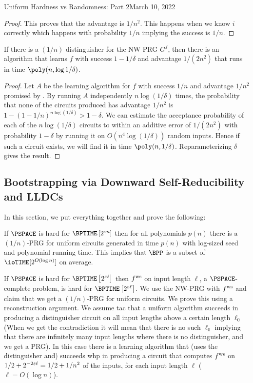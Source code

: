 \begin{lecture}{8}{Uniform Hardness vs Randomness: Part 2}{March 10, 2022}
\begin{proof}
This proves that the advantage is $1/n^2$. This happens when we know $i$ correctly which happens with probability $1/n$ implying the success is $1/n$.	
\end{proof}


\begin{corollary}\label{cor:learning-boost-success}
	If there is a $(1/n)$-distinguisher for the NW-PRG $G^f$, then there is an
	algorithm that learns $f$ with success $1 - 1/\delta$ and advantage
	$1/(2n^2)$ that runs in time $\poly(n, \log{1/\delta})$.
\end{corollary}

\begin{proof}
	Let $A$ be the learning algorithm for $f$ with success $1/n$ and advantage
	$1/n^2$ promised by . By running $A$
	independently $n \log(1/\delta)$ times, the probability that none of the
	circuits produced has advantage $1/n^2$ is $1 - (1 - 1/n)^{n\log(1/\delta)} >
	1 - \delta$. We can estimate the acceptance probability of each of the
	$n\log(1/\delta)$ circuits to within an additive error of $1/(2n^2)$ with
	probability $1 - \delta$ by running it on $O(n^4 \log(1/\delta))$ random
	inputs. Hence if such a circuit exists, we will find it in time $\poly(n,
	1/\delta)$. Reparameterizing $\delta$ gives the result.
\end{proof}


\subsection{Bootstrapping via Downward Self-Reducibility and LLDCs}
In this section, we put everything together and prove the following:
\begin{theorem}
	If $\PSPACE$ is hard for $\BPTIME\left[2^{\eps n}\right]$ then for all polynomials $p(n)$ there is a $(1/n)$-PRG for uniform circuits generated in time $p(n)$ with log-sized seed and polynomial running time. This implies that $\BPP$ is a subset of $\ioTIME[2^{O(\log n)}]$ on average.
\end{theorem}


If $\PSPACE$ is hard for $\BPTIME\left[2^{\eps \ell}\right]$ then $ f^{\text{ws}} $ on input length $\ell$, a $\PSPACE$-complete problem, is hard for $\BPTIME\left[2^{\eps \ell}\right]$. 
We use the NW-PRG with $ f^{\text{ws}} $ and claim that we get a $(1/n)$-PRG for uniform circuits. We prove this using a reconstruction argument. 
We assume tac that a uniform algorithm succeeds in producing a distinguisher circuit on all input lengths above a certain length $\ell_0$ (When we get the contradiction it will mean that there is no such $\ell_0$ implying that there are infinitely many input lengths where there is no distinguisher, and we get a PRG). In this case there is a learning algorithm that (uses the distinguisher and) succeeds whp in producing a circuit that computes $ f^{\text{ws}} $ on $1/2+2^{-2\varepsilon \ell} = 1/2+1/n^2$ of the inputs, for each input length $\ell$ ($\ell=O(\log n )$). 


\end{lecture}
